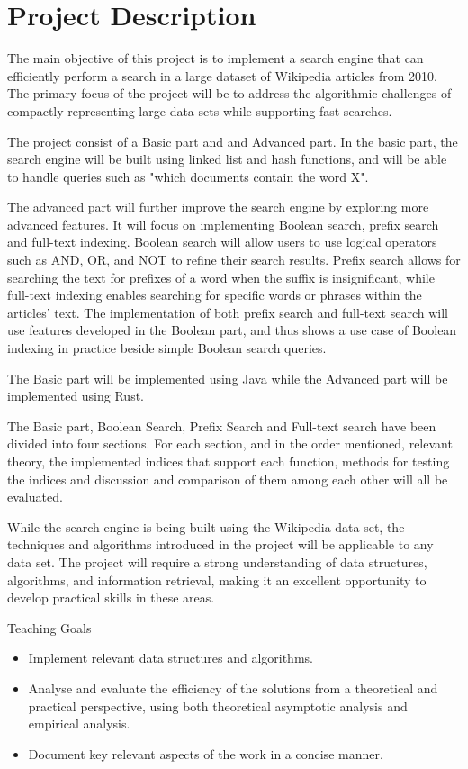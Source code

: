 \section{Project Description}
The main objective of this project is to implement a search engine that can efficiently perform a search in a large dataset of Wikipedia articles from 2010. The primary focus of the project will be to address the algorithmic challenges of compactly representing large data sets while supporting fast searches.

The project consist of a Basic part and and Advanced part. In the basic part, the search engine will be built using linked list and hash functions, and will be able to handle queries such as "which documents contain the word X". 

The advanced part will further improve the search engine by exploring more advanced features. It will focus on implementing Boolean search, prefix search and full-text indexing. Boolean search will allow users to use logical operators such as AND, OR, and NOT to refine their search results. Prefix search allows for searching the text for prefixes of a word when the suffix is insignificant, while full-text indexing enables searching for specific words or phrases within the articles' text. The implementation of both prefix search and full-text search will use features developed in the Boolean part, and thus shows a use case of Boolean indexing in practice beside simple Boolean search queries.

The Basic part will be implemented using Java while the Advanced part will be implemented using Rust.

The Basic part, Boolean Search, Prefix Search and Full-text search have  been divided into four sections. For each section, and in the order mentioned, relevant theory, the implemented indices that support each function, methods for testing the indices and discussion and comparison of them among each other will all be evaluated.

While the search engine is being built using the Wikipedia data set, the techniques and algorithms introduced in the project will be applicable to any data set. The project will require a strong understanding of data structures, algorithms, and information retrieval, making it an excellent opportunity to develop practical skills in these areas.

Teaching Goals
\begin{itemize}
    \item Implement relevant data structures and algorithms. 
    \item Analyse and evaluate the efficiency of the solutions from a theoretical and practical perspective, using both theoretical asymptotic analysis and empirical analysis.
    \item Document key relevant aspects of the work in a concise manner. 
\end{itemize}

